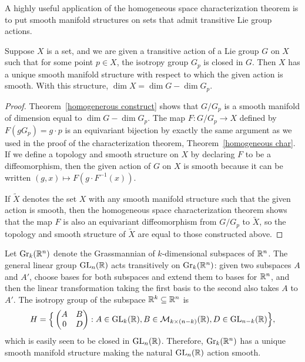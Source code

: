 A highly useful application of the homogeneous space characterization theorem is
to put smooth manifold structures on sets that admit transitive Lie group actions.
\begin{theorem}
Suppose $X$ is a set, and we are given a transitive action of a Lie group $G$ on $X$ such that for some point $p\in X$, the isotropy group $G_p$ is closed in $G$. Then $X$ has a unique smooth manifold structure with respect to which the given action is smooth. With this structure, $\dim X=\dim G-\dim G_p$.
\end{theorem}
\begin{proof}
Theorem~\ref{homogenerous construct} shows that $G/G_p$ is a smooth manifold of dimension equal to $\dim G-\dim G_p$. The map $F:G/G_p\to X$ defined by $F(gG_p)=g\cdot p$ is an equivariant bijection by exactly the same argument as we used in the proof of the characterization theorem, Theorem~\ref{homogeneous char}. If we define a topology and smooth structure on $X$ by declaring $F$ to be a diffeomorphism, then the given action of $G$ on $X$ is smooth because it can be written $(g,x)\mapsto F(g\cdot F^{-1}(x))$.\par
If $\widetilde{X}$ denotes the set $X$ with any smooth manifold structure such that the given action is smooth, then the homogeneous space characterization theorem shows that the map $F$ is also an equivariant diffeomorphism from $G/G_p$ to $\widetilde{X}$, so the topology and smooth structure of $\widetilde{X}$ are equal to those constructed above.
\end{proof}
\begin{example}\label{Grassmannian def}
Let $\mathrm{Gr}_k(\mathbb{R}^n)$ denote the Grassmannian of $k$-dimensional subspaces of $\mathbb{R}^n$. The general linear group $\mathrm{GL}_n(\mathbb{R})$ acts transitively on $\mathrm{Gr}_k(\mathbb{R}^n)$: given two subspaces $A$ and $A'$, choose bases for both subspaces and extend them to bases for $\mathbb{R}^n$, and then the linear transformation taking the first basis to the second also takes $A$ to $A'$. The isotropy group of the subspace $\mathbb{R}^k\subseteq\mathbb{R}^n$ is
\[H=\Big\{\begin{pmatrix}
A&B\\
0&D
\end{pmatrix}:A\in\mathrm{GL}_k(\mathbb{R}),B\in\mathcal{M}_{k\times(n-k)}(\mathbb{R}),D\in\mathrm{GL}_{n-k}(\mathbb{R})\Big\},\]
which is easily seen to be closed in $\mathrm{GL}_n(\mathbb{R})$. Therefore, $\mathrm{Gr}_k(\mathbb{R}^n)$ has a unique smooth manifold structure making the natural $\mathrm{GL}_n(\mathbb{R})$ action smooth.
\end{example}
